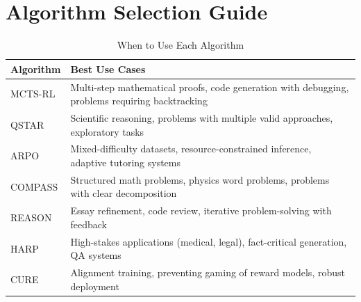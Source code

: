 \documentclass[11pt,a4paper]{article}
\begin{document}
\section{Algorithm Selection Guide}

\begin{table}[H]
\centering
\caption{When to Use Each Algorithm}
\begin{tabular}{lp{8cm}}
\toprule
\textbf{Algorithm} & \textbf{Best Use Cases} \\
\midrule
MCTS-RL & Multi-step mathematical proofs, code generation with debugging, problems requiring backtracking \\
QSTAR & Scientific reasoning, problems with multiple valid approaches, exploratory tasks \\
ARPO & Mixed-difficulty datasets, resource-constrained inference, adaptive tutoring systems \\
COMPASS & Structured math problems, physics word problems, problems with clear decomposition \\
REASON & Essay refinement, code review, iterative problem-solving with feedback \\
HARP & High-stakes applications (medical, legal), fact-critical generation, QA systems \\
CURE & Alignment training, preventing gaming of reward models, robust deployment \\
\bottomrule
\end{tabular}
\end{table}
\end{document}
